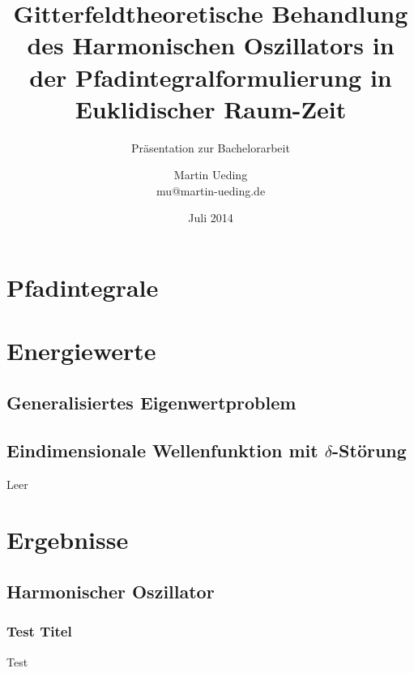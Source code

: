 \documentclass[11pt, ngerman, fleqn]{beamer}
\title{Gitterfeldtheoretische Behandlung des Harmonischen Oszillators in der Pfadintegralformulierung in Euklidischer Raum-Zeit}
\subtitle{Präsentation zur Bachelorarbeit}
\author{
    Martin Ueding \\ mu@martin-ueding.de
}
\date{Juli 2014}
\begin{document}
\begin{frame}
    \titlepage
\end{frame}

\begin{frame}
    \tableofcontents
\end{frame}

\section{Pfadintegrale}

\section{Energiewerte}

\subsection{Generalisiertes Eigenwertproblem}

\subsection{Eindimensionale Wellenfunktion mit $\delta$-Störung}

\begin{frame}
    Leer
\end{frame}


\section{Ergebnisse}

\subsection{Harmonischer Oszillator}

\begin{frame}
    \frametitle{Test Titel}
   Test 
\end{frame}
\end{document}
